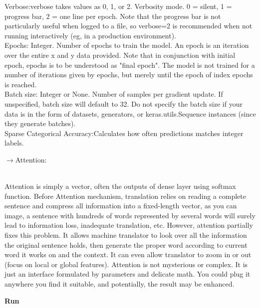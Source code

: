 \documentclass[a4paper,12pt]{article}
\begin{document}
Verbose:verbose takes values as 0, 1, or 2. Verbosity mode. 0 = silent, 1 = progress bar, 2 = one line per epoch. Note that the progress bar is not particularly useful when logged to a file, so verbose=2 is recommended when not running interactively (eg, in a production environment).\\

Epochs: Integer. Number of epochs to train the model. An epoch is an iteration over the entire x and y data provided. Note that in conjunction with initial epoch, epochs is to be understood as "final epoch". The model is not trained for a number of iterations given by epochs, but merely until the epoch of index epochs is reached.\\

Batch size: Integer or None. Number of samples per gradient update. If unspecified, batch size will default to 32. Do not specify the batch size if your data is in the form of datasets, generators, or keras.utils.Sequence instances (since they generate batches).\\


Sparse Categorical Accuracy:Calculates how often predictions matches integer labels.\\

\begin{large}
$\rightarrow$Attention:
\end{large}\\

Attention is simply a vector, often the outputs of dense layer using softmax function.
Before Attention mechanism, translation relies on reading a complete sentence and compress all information into a fixed-length vector, as you can image, a sentence with hundreds of words represented by several words will surely lead to information loss, inadequate translation, etc.
However, attention partially fixes this problem. It allows machine translator to look over all the information the original sentence holds, then generate the proper word according to current word it works on and the context. It can even allow translator to zoom in or out (focus on local or global features).
Attention is not mysterious or complex. It is just an interface formulated by parameters and delicate math. You could plug it anywhere you find it suitable, and potentially, the result may be enhanced.\\

\vspace*{2cm}

\textbf{Run}\\
\end{document}

